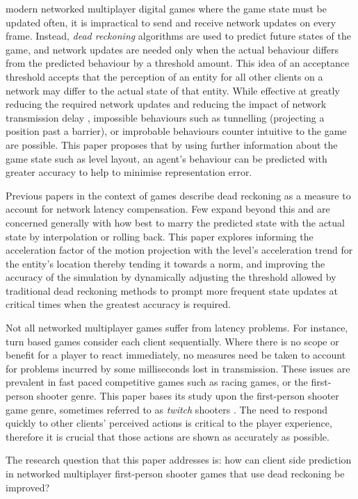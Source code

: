 \documentclass[journal]{IEEEtran}
\begin{document}
 modern networked multiplayer digital games where the game state must be updated often, it is impractical to send and receive network updates on every frame. Instead, \textit{dead reckoning} algorithms are used to predict future states of the game, and network updates are needed only when the actual behaviour differs from the predicted behaviour by a threshold amount. This idea of an acceptance threshold accepts that the perception of an entity for all other clients on a network may differ to the actual state of that entity. While effective at greatly reducing the required network updates and reducing the impact of network transmission delay \cite{pantel2002suitability}, impossible behaviours such as tunnelling (projecting a position past a barrier), or improbable behaviours counter intuitive to the game are possible. This paper proposes that by using further information about the game state such as level layout, an agent's behaviour can be predicted with greater accuracy to help to minimise representation error.

Previous papers in the context of games describe dead reckoning as a measure to account for network latency compensation. Few expand beyond this and are concerned generally with how best to marry the predicted state with the actual state by interpolation or rolling back. This paper explores informing the acceleration factor of the motion projection with the level's acceleration trend for the entity's location thereby tending it towards a norm, and improving the accuracy of the simulation by dynamically adjusting the threshold allowed by traditional dead reckoning methods to prompt more frequent state updates at critical times when the greatest accuracy is required.

Not all networked multiplayer games suffer from latency problems. For instance, turn based games consider each client sequentially. Where there is no scope or benefit for a player to react immediately, no measures need be taken to account for problems incurred by some milliseconds lost in transmission. These issues are prevalent in fast paced competitive games such as racing games, or the first-person shooter genre. This paper bases its study upon the first-person shooter game genre, sometimes referred to as \textit{twitch} shooters \cite{lee2015outatime}. The need to respond quickly to other clients' perceived actions is critical to the player experience, therefore it is crucial that those actions are shown as accurately as possible.

The research question that this paper addresses is: how can client side prediction in networked multiplayer first-person shooter games that use dead reckoning be improved?
\end{document}
